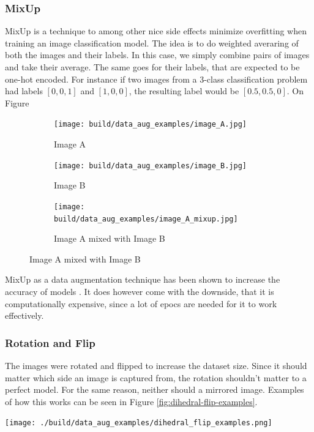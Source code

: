 \subsubsection{MixUp} \label{sec:mixup}
MixUp is a technique to among other nice side effects minimize overfitting when training 
an image classification model.
The idea is to do weighted averaring of both the images and their labels.
In this case, we simply combine pairs of images and take their average.
The same goes for their labels, that are expected to be one-hot encoded.
For instance if two images from a $3$-class classification problem had labels $[0,0,1]$ and $[1,0,0]$,
the resulting label would be $[0.5,0.5,0]$.
On Figure 
\begin{figure}
    \begin{subfigure}{0.3\textwidth}
        \texttt{[image: build/data\_aug\_examples/image\_A.jpg]}
        \caption{Image A}
        \label{fig:image-A}
    \end{subfigure}
    \begin{subfigure}{0.3\textwidth}
        \texttt{[image: build/data\_aug\_examples/image\_B.jpg]}
        \caption{Image B}
    \end{subfigure}
    \begin{subfigure}{0.3\textwidth}
        \texttt{[image: build/data\_aug\_examples/image\_A\_mixup.jpg]}
        \caption{Image A mixed with Image B}
    \end{subfigure}
    \label{fig:mixup-example}
\end{figure}

MixUp as a data augmentation technique has been shown to increase the accuracy of models \cite{mixup-paper}.
It does however come with the downside, that it is computationally expensive,
since a lot of epocs are needed for it to work effectively.

\subsubsection{Rotation and Flip}
The images were rotated and flipped to increase the dataset size.
Since it should matter which side an image is captured from, 
the rotation shouldn't matter to a perfect model.
For the same reason, neither should a mirrored image.
Examples of how this works can be seen in Figure \ref{fig:dihedral-flip-examples}.
\begin{center}
    \texttt{[image: ./build/data\_aug\_examples/dihedral\_flip\_examples.png]}
    \label{fig:dihedral-flip-examples}
\end{center}

